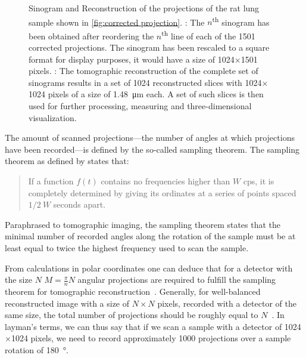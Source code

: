 \begin{figure}[htb]
{{%
			\label{subfig:rec}%
		}%
	}%
	\caption[Sinogram and Reconstruction]{Sinogram and Reconstruction of the projections of the rat lung sample shown in \autoref{fig:corrected projection}. : The $n$\textsuperscript{th} sinogram has been obtained after reordering the $n$\textsuperscript{th} line of each of the 1501 corrected projections. The sinogram has been rescaled to a square format for display purposes, it would have a size of 1024$\times$1501 pixels. : The tomographic reconstruction of the complete set of sinograms results in a set of 1024 reconstructed slices with 1024$\times$1024 pixels of a size of \SI{1.48}{\micro\meter} each. A set of such slices is then used for further processing, measuring and three-dimensional visualization.}
	\label{fig:Sin Rec}
\end{figure}%

The amount of scanned projections---the number of angles at which projections have been recorded---is defined by the so-called sampling theorem. The sampling theorem as defined by \citet{Shannon1949} states that: \begin{quote}If a function $f(t)$ contains no frequencies higher than $W$ cps, it is completely determined by giving its ordinates at a series of points spaced $1/2\ W$ seconds apart. \cite{Shannon1949}\end{quote}

Paraphrased to tomographic imaging, the sampling theorem states that the minimal number of recorded angles along the rotation of the sample must be at least equal to twice the highest frequency used to scan the sample.

From calculations in polar coordinates one can deduce that for a detector with the size $N$ $M=\frac{\pi}{n}N$ angular projections are required to fulfill the sampling theorem for tomographic reconstruction~\cite{Stampanoni2002a}. Generally, for well-balanced reconstructed image with a size of $N\times N$ pixels, recorded with a detector of the same size, the total number of projections should be roughly equal to $N$~\cite{Kak2002}. In layman's terms, we can thus say that if we scan a sample with a detector of 1024$\times$1024 pixels, we need to record approximately 1000 projections over a sample rotation of \SI{180}{\degree}.

